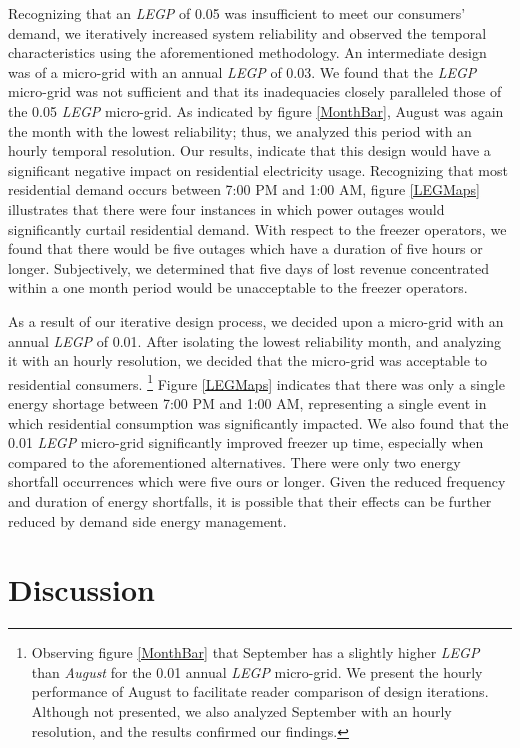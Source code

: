 \documentclass{article}
\begin{document}
Recognizing that an \emph{LEGP} of 0.05 was insufficient to meet our consumers' demand, we iteratively increased system reliability and observed the temporal characteristics using the aforementioned methodology.
An intermediate design was of a micro-grid with an annual \emph{LEGP} of 0.03. 
We found that the \emph{LEGP} micro-grid was not sufficient and that its inadequacies closely paralleled those of the 0.05 \emph{LEGP} micro-grid.
As indicated by figure \ref{MonthBar}, August was again the month with the lowest reliability; thus, we analyzed this period with an hourly temporal resolution.
Our results, indicate that this design would have a significant negative impact on residential electricity usage.
Recognizing that most residential demand occurs between 7:00 PM and 1:00 AM, figure \ref{LEGMaps} illustrates that there were four instances in which power outages would significantly curtail residential demand. 
With respect to the freezer operators, we found that there would be five outages which have a duration of five hours or longer. 
Subjectively, we determined that five days of lost revenue concentrated within a one month period would be unacceptable to the freezer operators. 

As a result of our iterative design process, we decided upon a micro-grid with an annual \emph{LEGP} of 0.01. After isolating the lowest reliability month, and analyzing it with an hourly resolution, we decided that the micro-grid was acceptable to residential consumers. 
%
%
\footnote{Observing figure \ref{MonthBar} that September has a slightly higher \emph{LEGP} than \emph{August} for the 0.01 annual \emph{LEGP} micro-grid. 
We present the hourly performance of August to facilitate reader comparison of design iterations. 
Although not presented, we also analyzed September with an hourly resolution, and the results confirmed our findings.}
%
%
%
Figure \ref{LEGMaps} indicates that there was only a single energy shortage between 7:00 PM and 1:00 AM, representing a single event in which residential consumption was significantly impacted.
We also found that the 0.01 \emph{LEGP} micro-grid significantly improved freezer up time, especially when compared to the aforementioned alternatives. There were only two energy shortfall occurrences which were five ours or longer. 
Given the reduced frequency and duration of energy shortfalls, it is possible that their effects can be further reduced by demand side energy management.

\section{Discussion}
\end{document}
